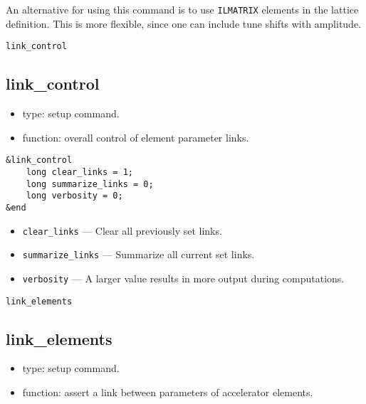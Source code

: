 \documentclass[11pt]{article}
\begin{document}
An alternative for using this command is to use {\tt ILMATRIX} elements in the lattice definition.  This is more
flexible, since one can include tune shifts with amplitude.

\begin{latexonly}
\newpage
\begin{center}{\Large\verb|link_control|}\end{center}
\end{latexonly}
\subsection{link\_control \label{subsec:linkcontrol}}

\begin{itemize}
\item type: setup command.
\item function: overall control of element parameter links.
\end{itemize}

\begin{verbatim}
&link_control
    long clear_links = 1;
    long summarize_links = 0;
    long verbosity = 0;
&end
\end{verbatim}

\begin{itemize}
\item \verb|clear_links| --- Clear all previously set links.
\item \verb|summarize_links| --- Summarize all current set links.
\item \verb|verbosity| --- A larger value results in more output
during computations.

\end{itemize}

\begin{latexonly}
\newpage
\begin{center}{\Large\verb|link_elements|}\end{center}
\end{latexonly}
\subsection{link\_elements \label{subsec:linkelements}}

\begin{itemize}
\item type: setup command.
\item function: assert a link between parameters of accelerator elements.
\end{itemize}
\end{document}
